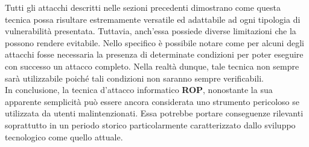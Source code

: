 Tutti gli attacchi descritti nelle sezioni precedenti dimostrano come questa tecnica possa risultare estremamente versatile ed adattabile ad ogni tipologia di vulnerabilità presentata. Tuttavia, anch'essa possiede diverse limitazioni
che la possono rendere evitabile. Nello specifico è possibile notare come per alcuni degli attacchi fosse necessaria la presenza di determinate condizioni per poter eseguire con successo un attacco completo. Nella realtà dunque, tale tecnica 
non sempre sarà utilizzabile poiché tali condizioni non saranno sempre verificabili.\\
In conclusione, la tecnica d'attacco informatico \textbf{ROP}, nonostante la sua apparente semplicità può essere ancora considerata uno strumento pericoloso se utilizzata da utenti malintenzionati. Essa potrebbe portare conseguenze rilevanti soprattutto in un periodo storico particolarmente caratterizzato dallo sviluppo tecnologico come quello attuale.